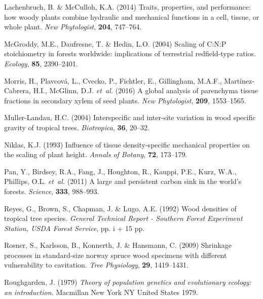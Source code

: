 \documentclass[a4paper, 12pt, leqno, dvipsnames]{article}\usepackage[]{graphicx}\usepackage[]{color}
\begin{document}
\begin{thebibliography}{50}
Lachenbruch, B. \& McCulloh, K.A. (2014) Traits, properties, and performance:
  how woody plants combine hydraulic and mechanical functions in a cell,
  tissue, or whole plant.
\newblock \emph{New Phytologist}, \textbf{204}, 747--764.

McGroddy, M.E., Daufresne, T. \& Hedin, L.O. (2004) {Scaling of C:N:P
  stoichiometry in forests worldwide: implications of terrestrial redfield-type
  ratios}.
\newblock \emph{Ecology}, \textbf{85}, 2390--2401.

Morris, H., Plavcová, L., Cvecko, P., Fichtler, E., Gillingham, M.A.F.,
  Martínez‐Cabrera, H.I., McGlinn, D.J. \emph{et~al.} (2016) A global analysis of parenchyma tissue fractions in
  secondary xylem of seed plants.
\newblock \emph{New Phytologist}, \textbf{209}, 1553--1565.

Muller-Landau, H.C. (2004) Interspecific and inter-site variation in wood
  specific gravity of tropical trees.
\newblock \emph{Biotropica}, \textbf{36}, 20--32.

Niklas, K.J. (1993) Influence of tissue density-specific mechanical properties
  on the scaling of plant height.
\newblock \emph{Annals of Botany}, \textbf{72}, 173--179.

Pan, Y., Birdsey, R.A., Fang, J., Houghton, R., Kauppi, P.E., Kurz, W.A.,
  Phillips, O.L. \emph{et~al.} (2011) A large and persistent carbon sink in the world's
  forests.
\newblock \emph{Science}, \textbf{333}, 988--993.

Reyes, G., Brown, S., Chapman, J. \& Lugo, A.E. (1992) Wood densities of
  tropical tree species.
\newblock \emph{General Technical Report - Southern Forest Experiment Station,
  USDA Forest Service}, pp. i + 15 pp.

Rosner, S., Karlsson, B., Konnerth, J. \& Hansmann, C. (2009) Shrinkage
  processes in standard-size norway spruce wood specimens with different
  vulnerability to cavitation.
\newblock \emph{Tree Physiology}, \textbf{29}, 1419--1431.

Roughgarden, J. (1979) \emph{Theory of population genetics and evolutionary
  ecology: an introduction.}
\newblock Macmillan New York NY United States 1979.


\end{thebibliography}
\end{document}
